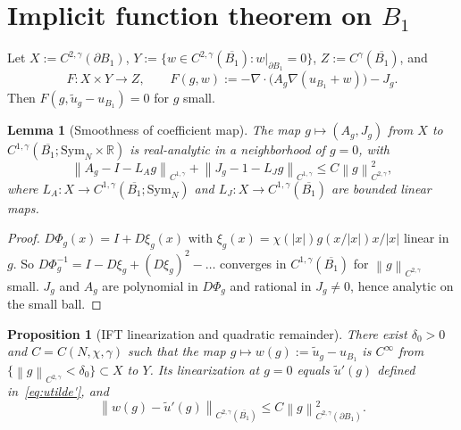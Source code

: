 \documentclass[11pt]{article}
\newtheorem{proposition}[theorem]{Proposition}
\newtheorem{lemma}[theorem]{Lemma}
\theoremstyle{definition}
\newcommand{\R}{\mathbb{R}}
\newcommand{\norm}[1]{\left\|#1\right\|}
\newcommand{\abs}[1]{\left|#1\right|}
\begin{document}
\section{Implicit function theorem on $B_1$}\label{sec:ift}

Let $X:=C^{2,\gamma}(\partial B_1)$,
$Y:=\{w\in C^{2,\gamma}(\overline{B_1}):w\big|_{\partial B_1}=0\}$,
$Z:=C^\gamma(\overline{B_1})$, and
\[
F:X\times Y\to Z,\qquad
F(g,w):=-\nabla\cdot\bigl(A_g\nabla(u_{B_1}+w)\bigr)-J_g.
\]
Then $F(g,\widetilde u_g-u_{B_1})=0$ for $g$ small.

\begin{lemma}[Smoothness of coefficient map]\label{lem:coeffsmooth}
The map $g\mapsto(A_g,J_g)$ from $X$ to $C^{1,\gamma}(\overline{B_1};\mathrm{Sym}_N\times\R)$
is real-analytic in a neighborhood of $g=0$, with
\[
\norm{A_g-I-L_A g}_{C^{1,\gamma}}+\norm{J_g-1-L_J g}_{C^{1,\gamma}}
\le C\norm{g}_{C^{2,\gamma}}^2,
\]
where $L_A:X\to C^{1,\gamma}(\overline{B_1};\mathrm{Sym}_N)$ and
$L_J:X\to C^{1,\gamma}(\overline{B_1})$ are bounded linear maps.
\end{lemma}

\begin{proof}
$D\Phi_g(x)=I+D\xi_g(x)$ with $\xi_g(x)=\chi(\abs x)g(x/\abs x)x/\abs x$
linear in $g$. So $D\Phi_g^{-1}=I-D\xi_g+(D\xi_g)^2-\ldots$ converges in
$C^{1,\gamma}(\overline{B_1})$ for $\norm{g}_{C^{2,\gamma}}$ small. $J_g$ and
$A_g$ are polynomial in $D\Phi_g$ and rational in $J_g\ne0$, hence analytic
on the small ball.
\end{proof}

\begin{proposition}[IFT linearization and quadratic remainder]\label{prop:ift}
There exist $\delta_0>0$ and $C=C(N,\chi,\gamma)$ such that the map
$g\mapsto w(g):=\widetilde u_g-u_{B_1}$ is $C^\infty$ from
$\{\norm{g}_{C^{2,\gamma}}<\delta_0\}\subset X$ to $Y$. Its linearization at
$g=0$ equals $\widetilde u'(g)$ defined in~\eqref{eq:utilde'}, and
\begin{equation}\label{eq:quadrem}
\norm{w(g)-\widetilde u'(g)}_{C^{2,\gamma}(\overline{B_1})}
\le C\norm{g}_{C^{2,\gamma}(\partial B_1)}^2.
\end{equation}
\end{proposition}
\end{document}
